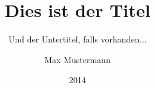 \titlehead{{\Large Universität zu Köln\\}
II\@. Physikalisches Institut\\
Zülpicher Straße 77\\
D-50937 Köln}
\subject{Diplomarbeit}
\title{Dies ist der Titel}
\subtitle{Und der Untertitel, falls vorhanden...}
\author{Max Mustermann}
\date{2014}
\publishers{Betreut durch Prof.~Dr.~Albert Einstein\\
Zweitgutachter Prof.~Dr.~Max von Laue
}
\maketitle


